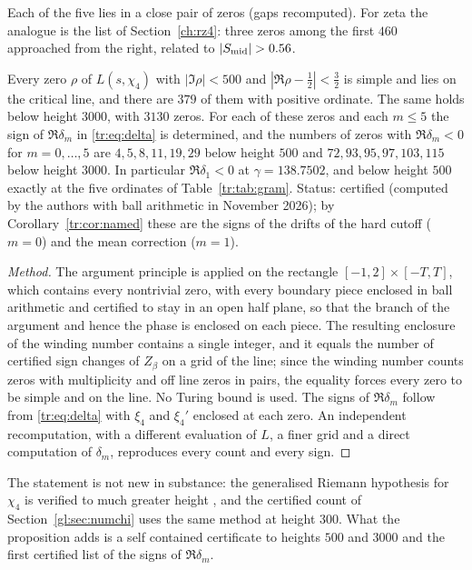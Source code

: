 Each of the five lies in a close pair of zeros (gaps recomputed). For zeta the analogue is the list of Section~\ref{ch:rz4}: three zeros among the first $460$ approached from the right, related to $|S_{\rm mid}|>0.56$.

\begin{proposition}\label{tr:prop:certify}
Every zero $\rho$ of $L(s,\chi_4)$ with $|\Im\rho|<500$ and $|\Re\rho-\frac12|<\frac32$ is simple and lies on the critical line, and there are $379$ of them with positive ordinate. The same holds below height $3000$, with $3130$ zeros. For each of these zeros and each $m\le5$ the sign of $\Re\delta_m$ in \eqref{tr:eq:delta} is determined, and the numbers of zeros with $\Re\delta_m<0$ for $m=0,\dots,5$ are $4,5,8,11,19,29$ below height $500$ and $72,93,95,97,103,115$ below height $3000$. In particular $\Re\delta_1<0$ at $\gamma=138.7502$, and below height $500$ exactly at the five ordinates of Table~\ref{tr:tab:gram}. Status: certified (computed by the authors with ball arithmetic in November 2026); by Corollary~\ref{tr:cor:named} these are the signs of the drifts of the hard cutoff ($m=0$) and the mean correction ($m=1$).
\end{proposition}

\begin{proof}[Method]
The argument principle is applied on the rectangle $[-1,2]\times[-T,T]$, which contains every nontrivial zero, with every boundary piece enclosed in ball arithmetic and certified to stay in an open half plane, so that the branch of the argument and hence the phase is enclosed on each piece. The resulting enclosure of the winding number contains a single integer, and it equals the number of certified sign changes of $Z_\beta$ on a grid of the line; since the winding number counts zeros with multiplicity and off line zeros in pairs, the equality forces every zero to be simple and on the line. No Turing bound is used. The signs of $\Re\delta_m$ follow from \eqref{tr:eq:delta} with $\xi_4$ and $\xi_4'$ enclosed at each zero. An independent recomputation, with a different evaluation of $L$, a finer grid and a direct computation of $\delta_m$, reproduces every count and every sign.
\end{proof}

The statement is not new in substance: the generalised Riemann hypothesis for $\chi_4$ is verified to much greater height \cite{Rumely93,Platt16}, and the certified count of Section~\ref{gl:sec:numchi} uses the same method at height $300$. What the proposition adds is a self contained certificate to heights $500$ and $3000$ and the first certified list of the signs of $\Re\delta_m$.


